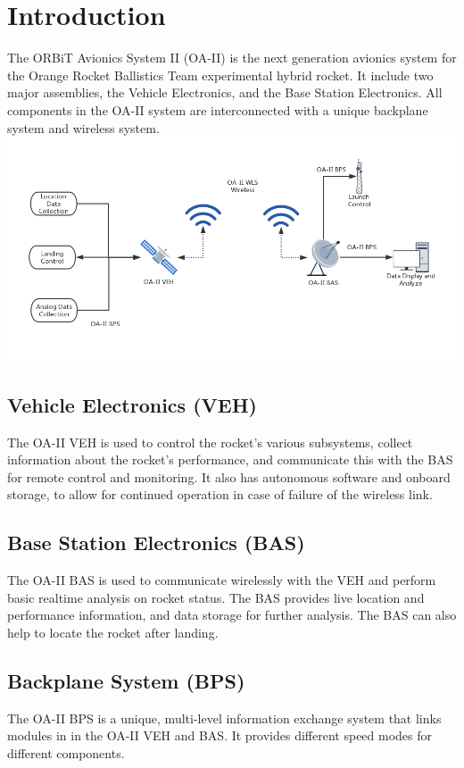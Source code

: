 \documentclass[12pt,article]{memoir}
\begin{document}
\section{Introduction}
The ORBiT Avionics System II (OA-II) is the next generation avionics system for the Orange Rocket Ballistics Team experimental hybrid rocket. It include two major assemblies, the Vehicle Electronics, and the Base Station Electronics. All components in the OA-II system are interconnected with a unique backplane system and wireless system.\\
\includegraphics[width=\textwidth]{sys_diag.png}
\subsection{Vehicle Electronics (VEH)}
The OA-II VEH is used to control the rocket's various subsystems, collect information about the rocket's performance, and communicate this with the BAS for remote control and monitoring. It also has autonomous software and onboard storage, to allow for continued operation in case of failure of the wireless link.
\subsection{Base Station Electronics (BAS)}
The OA-II BAS is used to communicate wirelessly with the VEH and perform basic realtime analysis on rocket status. The BAS provides live location and performance information, and data storage for further analysis. The BAS can also help to locate the rocket after landing.
\subsection{Backplane System (BPS)}
The OA-II BPS is a unique, multi-level information exchange system that links modules in in the OA-II VEH and BAS. It provides different speed modes for different components.
\end{document}
